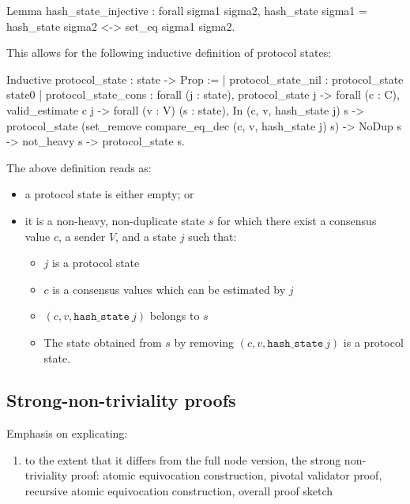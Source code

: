 \begin{coq}
Lemma hash_state_injective : forall sigma1 sigma2,
  hash_state sigma1 = hash_state sigma2
  <->
  set_eq sigma1 sigma2.
\end{coq}    

This allows for the following inductive definition of protocol states:

\begin{coq}
Inductive protocol_state : state -> Prop :=
| protocol_state_nil : protocol_state state0
| protocol_state_cons : forall (j : state),
    protocol_state j ->
    forall (c : C),
      valid_estimate c j ->
      forall (v : V) (s : state),
        In (c, v, hash_state j) s ->
        protocol_state (set_remove compare_eq_dec (c, v, hash_state j) s) ->
        NoDup s ->
        not_heavy s ->
        protocol_state s.
\end{coq}

The above definition reads as:
\begin{itemize}
    \item a protocol state is either empty; or
    \item it is a non-heavy, non-duplicate state $s$ for which
        there exist a consensus value $c$, a sender $V$, and a state $j$ such that:
        \begin{itemize}
            \item $j$ is a protocol state
            \item $c$ is a consensus values which can be estimated by $j$
            \item $(c,v, \texttt{hash\_state}\  j)$ belongs to $s$
            \item The state obtained from $s$ by removing
                $(c,v, \texttt{hash\_state}\  j)$ is a protocol state.
        \end{itemize}
\end{itemize}


\subsection{Strong-non-triviality proofs}
Emphasis on explicating: 
\begin{enumerate}
	\item to the extent that it differs from the full node version, the strong non-triviality proof: atomic equivocation construction, pivotal validator proof, recursive atomic equivocation construction, overall proof sketch
\end{enumerate}
